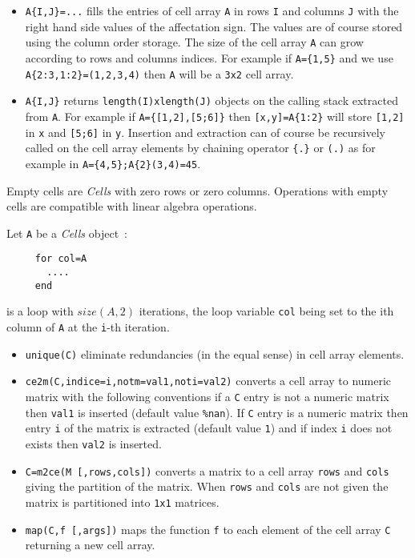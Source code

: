 \begin{itemize}
\item \verb+A{I,J}=...+ fills the entries of cell array \verb+A+ in rows \verb+I+ and columns \verb!J! 
  with the right hand side values of the affectation sign. The values are of course stored using the 
  column order storage. The size of the cell array \verb+A+ can grow according to rows and columns indices. 
  For example if \verb+A={1,5}+ and we use \verb+A{2:3,1:2}=(1,2,3,4)+ then \verb!A! will be a \verb!3x2! cell 
  array.
\item \verb+A{I,J}+ returns \verb+length(I)xlength(J)+ objects on the calling stack extracted from 
  \verb!A!. For example if \verb+A={[1,2],[5;6]}+ then \verb+[x,y]=A{1:2}+ will store \verb+[1,2]+ in 
  \verb+x+ and \verb+[5;6]+ in \verb+y+.
  Insertion and extraction can of course be recursively called on the cell array elements by chaining 
  operator \verb+{.}+ or \verb+(.)+ as for example in \verb!A={4,5};A{2}(3,4)=45!. 
\end{itemize}

Empty cells are \emph{Cells} with zero rows or zero columns. Operations with empty cells
are compatible with linear algebra operations. 

Let \verb+A+ be a \emph{Cells} object~:
\begin{verbatim}
     for col=A
       ....
     end
\end{verbatim} 
is a loop with $size(A,2)$ iterations, the loop 
variable  \verb+col+ being set to the ith column of \verb+A+ at the \verb!i!-th iteration.

\begin{itemize}
   \item \verb+unique(C)+ eliminate redundancies (in the equal sense) in cell array elements. 
   \item \verb+ce2m(C,indice=i,notm=val1,noti=val2)+ converts a cell array to numeric matrix
     with the following conventions if a \verb+C+ entry is not a numeric matrix then \verb!val1! is inserted 
     (default value \verb!%nan!). If \verb+C+ entry is a numeric matrix then entry \verb!i! of the matrix 
     is extracted (default value \verb!1!) and if index \verb!i! does not exists then \verb!val2! is inserted.
     \label{ce2m}
   \item \verb+C=m2ce(M [,rows,cols])+ converts a matrix to a cell array \verb+rows+ and \verb+cols+ giving the 
     partition of the matrix. When \verb+rows+ and \verb+cols+ are not given the matrix is partitioned into \verb!1x1! 
     matrices.
     \label{m2ce}
   \item \verb+map(C,f [,args])+ maps the function \verb!f! to each element of the cell array \verb!C! returning 
     a new cell array.
     \label{map}
\end{itemize}


